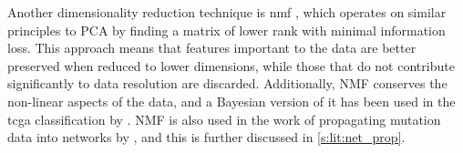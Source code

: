 Another dimensionality reduction technique is \acrfull{nmf} \citep{Lee1999-fj}, which operates on similar principles to PCA by finding a matrix of lower rank with minimal information loss. This approach means that features important to the data are better preserved when reduced to lower dimensions, while those that do not contribute significantly to data resolution are discarded. Additionally, NMF conserves the non-linear aspects of the data, and a Bayesian version of it has been used in the \acrlong{tcga} classification by \citet{Robertson2017-mg}. NMF is also used in the work of propagating mutation data into networks by \citet{Yang2016-dm, Cai2008-fv}, and this is further discussed in \cref{s:lit:net_prop}.

